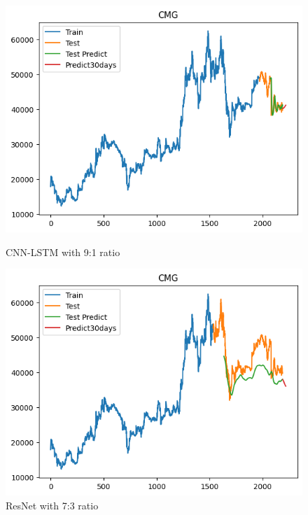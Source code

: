 \documentclass[conference]{IEEEtran}
\begin{document}
\begin{figure}[H]
    \centering
    \begin{minipage}{0.24\textwidth}
        \centering
        \includegraphics[width=\textwidth]{Figure/CMG/cnnlstm91.png}
        \caption{CNN-LSTM with 9:1 ratio}
        \label{fig:image1}
    \end{minipage}
    \hfill
    \begin{minipage}{0.24\textwidth}
        \centering
        \includegraphics[width=\textwidth]{Figure/CMG/resnet73.png}
        \caption{ResNet with 7:3 ratio}
        \label{fig:image2}
    \end{minipage}
\end{figure}
\end{document}
